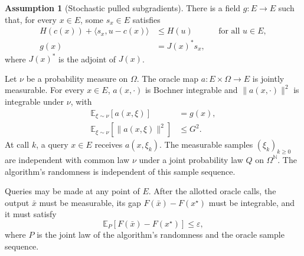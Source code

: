 \documentclass[10pt]{article}
\theoremstyle{definition}
\newtheorem{assumption}{Assumption}
\begin{document}
\begin{assumption}[Stochastic pulled subgradients]
There is a field $g:E\to E$ such that, for every $x\in E$, some $s_x\in E$ satisfies
\[
\begin{aligned}
H(c(x))+\langle s_x,u-c(x)\rangle&\leq H(u)
&&\text{for all }u\in E,\\
g(x)&=J(x)^*s_x,
\end{aligned}
\]
where $J(x)^*$ is the adjoint of $J(x)$.

Let $\nu$ be a probability measure on $\Omega$. The oracle map $a:E\times\Omega\to E$ is jointly measurable. For every $x\in E$, $a(x,\cdot)$ is Bochner integrable and $\|a(x,\cdot)\|^2$ is integrable under $\nu$, with
\[
\begin{aligned}
\mathbb{E}_{\xi\sim\nu}[a(x,\xi)]&=g(x),\\
\mathbb{E}_{\xi\sim\nu}[\|a(x,\xi)\|^2]&\leq G^2.
\end{aligned}
\]
At call $k$, a query $x\in E$ receives $a(x,\xi_k)$. The measurable samples $(\xi_k)_{k\geq0}$ are independent with common law $\nu$ under a joint probability law $Q$ on $\Omega^{\mathbb{N}}$. The algorithm's randomness is independent of this sample sequence.
\end{assumption}

Queries may be made at any point of $E$. After the allotted oracle calls, the output $\bar{x}$ must be measurable, its gap $F(\bar{x})-F(x^\star)$ must be integrable, and it must satisfy
\[
\mathbb{E}_{P}[F(\bar{x})-F(x^\star)]\leq\varepsilon,
\]
where $P$ is the joint law of the algorithm's randomness and the oracle sample sequence.
\end{document}
